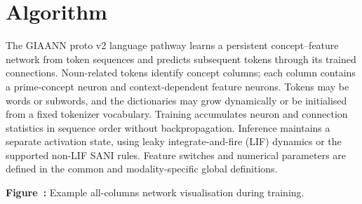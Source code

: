 \section{Algorithm}

The GIAANN proto v2 language pathway learns a persistent concept--feature network from token sequences and predicts subsequent tokens through its trained connections. Noun-related tokens identify concept columns; each column contains a prime-concept neuron and context-dependent feature neurons. Tokens may be words or subwords, and the dictionaries may grow dynamically or be initialised from a fixed tokenizer vocabulary. Training accumulates neuron and connection statistics in sequence order without backpropagation. Inference maintains a separate activation state, using leaky integrate-and-fire (LIF) dynamics or the supported non-LIF SANI rules. Feature switches and numerical parameters are defined in the common and modality-specific global definitions.

\begin{center}

\par\smallskip
{}\label{fig:giaannproto1c_allcolumns_train_005}
\textbf{Figure~\thefigure:} Example all-columns network visualisation during training.
\end{center}

